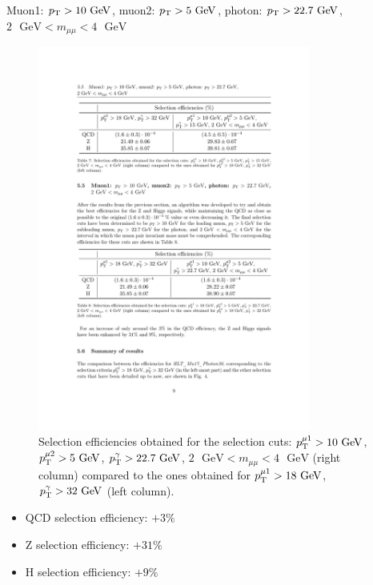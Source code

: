 \documentclass[aspectratio = 1610, xcolor = dvipsnames]{beamer}
\newcommand{\GeV}{\textrm{ }\mathrm{GeV}}
\newcommand{\pt}{p_{\rm T}}
\newcommand{\red}{\textcolor{unipd}}
\begin{document}

    \begin{frame}[t]{Muon1: $\pt > 10\GeV$, muon2: $\pt > 5\GeV$, photon: $\pt>22.7\GeV$, $2\GeV<m_{\mu\mu}<4\GeV$}
        
        \begin{figure}[c]
            \centering
            \includegraphics[width=0.8\textwidth]{images/Mu10_Mu05_Ph22700MeV_2mumuM4_table.pdf}
            \caption{Selection efficiencies obtained for the selection cuts: $\pt^{\mu 1} > 10\GeV$, $\pt^{\mu 2} > 5\GeV$, $\pt^{\gamma} > 22.7\GeV$, $2\GeV < m_{\mu\mu} < 4\GeV$ (right column) compared to the ones obtained for $\pt^{\mu 1} > 18\GeV$, $\pt^{\gamma} > 32\GeV$ (left column).
            \label{im:Mu10_Mu05_Ph22.7_2mumuM4_table}}
        \end{figure}
        
        \begin{itemize}
            \item QCD selection efficiency: \red{$ + 3\%$}
            \item Z selection efficiency: \red{$ + 31\%$}
            \item H selection efficiency: \red{$ + 9\%$}
        \end{itemize}

    \end{frame}
\end{document}
